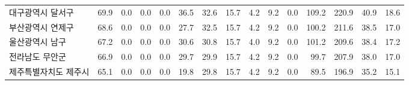 \begin{defaulttable}
\begin{tabular}{lrrrrrrrrrrrrrr}
대구광역시 달서구 & 69.9 & 0.0 & 0.0 & 0.0 & 36.5 & 32.6 & 15.7 & 4.2 & 9.2 & 0.0 & 109.2 & 220.9 & 40.9 & 18.6 \\
부산광역시 연제구 & 68.6 & 0.0 & 0.0 & 0.0 & 27.7 & 32.5 & 15.7 & 4.2 & 9.2 & 0.0 & 100.2 & 211.6 & 38.5 & 17.0 \\
울산광역시 남구 & 67.2 & 0.0 & 0.0 & 0.0 & 30.6 & 30.8 & 15.7 & 4.0 & 9.2 & 0.0 & 101.2 & 209.6 & 38.4 & 17.2 \\
전라남도 무안군 & 66.9 & 0.0 & 0.0 & 0.0 & 29.7 & 29.9 & 15.7 & 4.2 & 9.2 & 0.0 & 99.7 & 207.9 & 38.0 & 17.0 \\
제주특별자치도 제주시 & 65.1 & 0.0 & 0.0 & 0.0 & 19.8 & 29.8 & 15.7 & 4.2 & 9.2 & 0.0 & 89.5 & 196.9 & 35.2 & 15.1 \\
\bottomrule
\end{tabular}

\end{defaulttable}